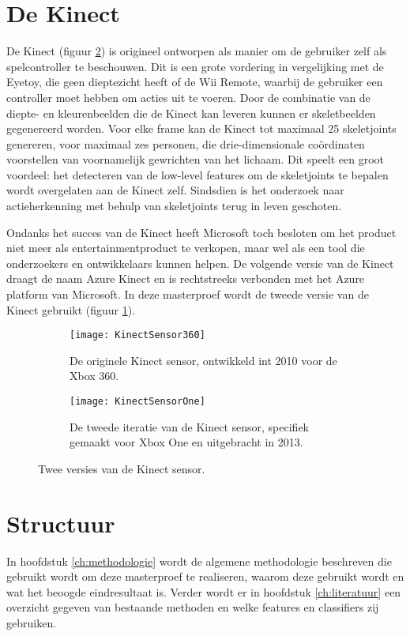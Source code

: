 \section{De Kinect}
De Kinect (figuur \ref{fig:KinectSensorVersies}) is origineel ontworpen als manier om de gebruiker zelf als spelcontroller te beschouwen. Dit is een grote vordering in vergelijking met de Eyetoy, die geen dieptezicht heeft of de Wii Remote, waarbij de gebruiker een controller moet hebben om acties uit te voeren. Door de combinatie van de diepte- en kleurenbeelden die de Kinect kan leveren kunnen er skeletbeelden gegenereerd worden. Voor elke frame kan de Kinect tot maximaal 25 skeletjoints genereren, voor maximaal zes personen, die drie-dimensionale coördinaten voorstellen van voornamelijk gewrichten van het lichaam. Dit speelt een groot voordeel: het detecteren van de low-level features om de skeletjoints te bepalen wordt overgelaten aan de Kinect zelf. Sindsdien is het onderzoek naar actieherkenning met behulp van skeletjoints terug in leven geschoten.

Ondanks het succes van de Kinect heeft Microsoft toch besloten om het product niet meer als entertainmentproduct te verkopen, maar wel als een tool die onderzoekers en ontwikkelaars kunnen helpen. De volgende versie van de Kinect draagt de naam Azure Kinect en is rechtstreeks verbonden met het Azure platform van Microsoft. In deze masterproef wordt de tweede versie van de Kinect gebruikt (figuur \ref{fig:KinectSensorOne}).

\begin{figure}
	\begin{subfigure}[t]{0.48\textwidth}
		\texttt{[image: KinectSensor360]}
		\caption{De originele Kinect sensor, ontwikkeld int 2010 voor de Xbox 360.}
	\end{subfigure}
	\begin{subfigure}[t]{0.48\textwidth}
		\texttt{[image: KinectSensorOne]}
		\caption{De tweede iteratie van de Kinect sensor, specifiek gemaakt voor Xbox One en uitgebracht in 2013.}
		\label{fig:KinectSensorOne}
	\end{subfigure}
	\caption{Twee versies van de Kinect sensor.}
	\label{fig:KinectSensorVersies}
\end{figure}




\section{Structuur}
In hoofdstuk \ref{ch:methodologie} wordt de algemene methodologie beschreven die gebruikt wordt om deze masterproef te realiseren, waarom deze gebruikt wordt en wat het beoogde eindresultaat is. Verder wordt er in hoofdstuk \ref{ch:literatuur} een overzicht gegeven van bestaande methoden en welke features en classifiers zij gebruiken.
